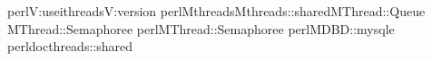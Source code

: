 perl\PGZhy{}V:useithreads\PGZhy{}V:version
perl\PGZhy{}Mthreads\PGZhy{}Mthreads::shared\PGZhy{}MThread::Queue
\PGZhy{}MThread::Semaphore\PGZhy{}e
perl\PGZhy{}MThread::Semaphore\PGZhy{}e
perl\PGZhy{}MDBD::mysql\PGZhy{}e
perldocthreads::shared
